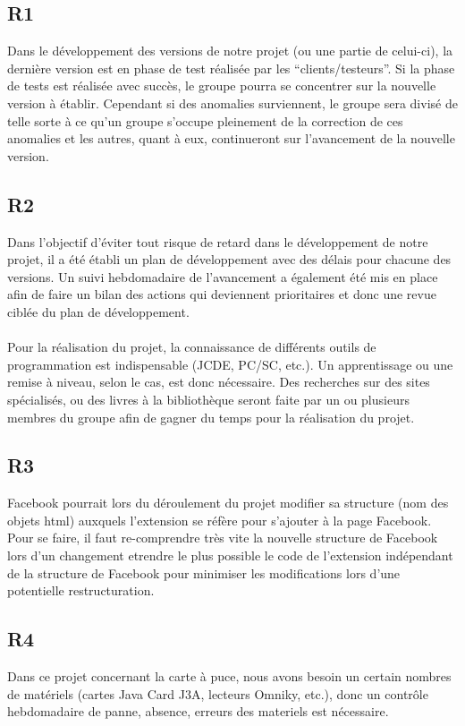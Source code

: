 \documentclass[a4paper,11pt,french]{article}
\begin{document}
\subsection*{R1}
Dans le développement des versions de notre projet (ou une partie de celui-ci),
la dernière version est en phase de test réalisée par les ``clients/testeurs''.
Si la phase de tests est réalisée avec succès, le groupe pourra se concentrer
sur la nouvelle version à établir. Cependant si des anomalies surviennent, le
groupe sera divisé de telle sorte à ce qu'un groupe s'occupe pleinement de la
correction de ces anomalies et les autres, quant à eux, continueront sur
l'avancement de la nouvelle version.

\subsection*{R2}
Dans l'objectif d'éviter tout risque de retard dans le développement de notre
projet, il a été établi un plan de développement avec des délais pour chacune
des versions. Un suivi hebdomadaire de l'avancement a également été mis en place
afin de faire un bilan des actions qui deviennent prioritaires et donc une revue
ciblée du plan de développement.
\paragraph{}
Pour la réalisation du projet, la connaissance de différents outils de
programmation est indispensable (JCDE, PC/SC, etc.). Un apprentissage ou
une remise à niveau, selon le cas, est donc nécessaire. Des recherches sur des
sites spécialisés, ou des livres à la bibliothèque seront faite par un ou
plusieurs membres du groupe afin de gagner du temps pour la réalisation du
projet.

\subsection*{R3}
Facebook pourrait lors du déroulement du projet modifier sa structure
(nom des objets html) auxquels l'extension se réfère pour s'ajouter à la page Facebook. Pour se 
faire, il faut re-comprendre très vite la nouvelle structure de
Facebook lors d'un changement etrendre le plus possible le code de l'extension indépendant de la
structure de Facebook pour
minimiser les modifications lors d'une potentielle restructuration.

\subsection*{R4}
Dans ce projet concernant la carte à puce, nous avons besoin un certain nombres 
de matériels (cartes Java Card J3A, lecteurs Omniky, etc.), donc un contrôle 
hebdomadaire de panne, absence, erreurs des materiels est nécessaire. 
\end{document}
